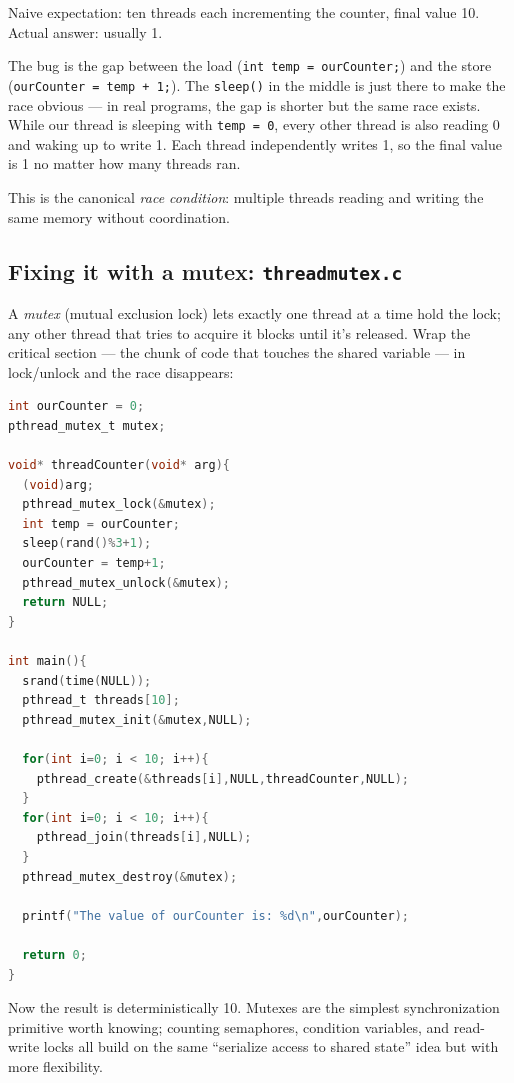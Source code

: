 \documentclass[11pt]{article}
\begin{document}
Naive expectation: ten threads each incrementing the counter, final
value 10. Actual answer: usually 1.

The bug is the gap between the load (\texttt{int temp = ourCounter;})
and the store (\texttt{ourCounter = temp + 1;}). The
\texttt{sleep()} in the middle is just there to make the race obvious
--- in real programs, the gap is shorter but the same race exists.
While our thread is sleeping with \texttt{temp = 0}, every other
thread is also reading 0 and waking up to write 1. Each thread
independently writes 1, so the final value is 1 no matter how many
threads ran.

This is the canonical \emph{race condition}: multiple threads
reading and writing the same memory without coordination.

\subsection*{Fixing it with a mutex: \texttt{threadmutex.c}}

A \emph{mutex} (mutual exclusion lock) lets exactly one thread at a
time hold the lock; any other thread that tries to acquire it blocks
until it's released. Wrap the critical section --- the chunk of code
that touches the shared variable --- in lock/unlock and the race
disappears:

\begin{lstlisting}[language=C]
int ourCounter = 0;
pthread_mutex_t mutex;

void* threadCounter(void* arg){
  (void)arg;
  pthread_mutex_lock(&mutex);
  int temp = ourCounter;
  sleep(rand()%3+1);
  ourCounter = temp+1;
  pthread_mutex_unlock(&mutex);
  return NULL;
}

int main(){
  srand(time(NULL));
  pthread_t threads[10];
  pthread_mutex_init(&mutex,NULL);

  for(int i=0; i < 10; i++){
    pthread_create(&threads[i],NULL,threadCounter,NULL);
  }
  for(int i=0; i < 10; i++){
    pthread_join(threads[i],NULL);
  }
  pthread_mutex_destroy(&mutex);

  printf("The value of ourCounter is: %d\n",ourCounter);

  return 0;
}
\end{lstlisting}

Now the result is deterministically 10. Mutexes are the simplest
synchronization primitive worth knowing; counting semaphores,
condition variables, and read-write locks all build on the same
``serialize access to shared state'' idea but with more flexibility.
\end{document}
